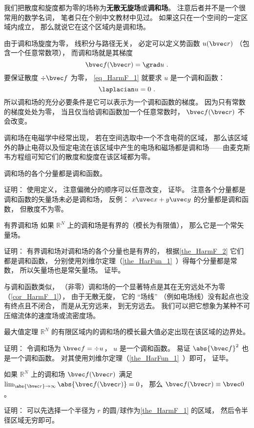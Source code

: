 


我们把散度和旋度都为零的场称为\textbf{无散无旋场}或\textbf{调和场}。 注意后者并不是一个很常用的数学名词， 笔者只在个别中文教材中见过。 如果这只在一个空间的一定区域内成立， 那么就说它在这个区域内是调和场。

由于调和场旋度为零， 线积分与路径无关， 必定可以定义势函数 $u(\bvec r)$ （包含一个任意常数项）， 而调和场就是其梯度
\begin{equation}\label{eq_HarmF_1}
\bvec f(\bvec r) = \grad u~.
\end{equation}
要保证散度 $\div \bvec f$ 为零， \autoref{eq_HarmF_1} 就要求 $u$ 是一个调和函数：
\begin{equation}
\laplacian u = 0~.
\end{equation}
所以调和场的充分必要条件是它可以表示为一个调和函数的梯度。 因为只有常数的梯度处处为零， 当且仅当给调和函数加一个任意常数时， $\bvec f(\bvec r)$ 不会改变。

调和场在电磁学中经常出现， 若在空间选取中一个不含电荷的区域， 那么该区域外的静止电荷以及恒定电流在该区域中产生的电场和磁场都是调和场——由麦克斯韦方程组可知它们的散度和旋度在该区域都为零。

\begin{theorem}{}\label{the_HarmF_2}
调和场的各个分量都是调和函数。
\end{theorem}
证明： 使用定义， 注意偏微分的顺序可以任意改变， 证毕。 注意各个分量都是调和函数的矢量场未必是调和场， 反例： $x\uvec x + y \uvec y$ 的分量都是调和函数， 但散度不为零。

\begin{corollary}{有界调和场}
如果 $\mathbb R^N$ 上的调和场是有界的（模长为有限值）， 那么它是一个常矢量场。
\end{corollary}
证明： 有界调和场对调和场的各个分量也是有界的， 根据\autoref{the_HarmF_2} 它们都是调和函数， 分别使用刘维尔定理（\autoref{the_HarFun_1}~）得每个分量都是常数， 所以矢量场也是常矢量场。 证毕。

与调和函数类似， （非零）调和场的一个显著特点是其在无穷远处不为零（\autoref{cor_HarmF_1}）， 由于无散无旋， 它的 “场线” （例如电场线）没有起点也没有终点且不闭合， 而是从无穷远来， 到无穷远去。 我们可以把它想象为某种不可压缩流体的速度场或流密度场。

\begin{theorem}{最大值定理}\label{the_HarmF_1}
$\mathbb R^N$ 的有限区域内的调和场的模长最大值必定出现在该区域的边界处。
\end{theorem}
证明： 令调和场为 $\bvec f = \div u$， $u$ 是一个调和函数。 易证 $\abs{\bvec f}^2$ 也是一个调和函数。 对其使用刘维尔定理（\autoref{the_HarFun_1}~）即可， 证毕。

\begin{corollary}{}\label{cor_HarmF_1}
如果 $\mathbb R^N$ 上的调和场 $\bvec f(\bvec r)$ 满足 $\lim_{\abs{\bvec r}\to \infty} \abs{\bvec f(\bvec r)}  = 0$， 那么 $\bvec f(\bvec r) \equiv \bvec 0$。
\end{corollary}
证明： 可以先选择一个半径为 $r$ 的圆/球作为\autoref{the_HarmF_1} 的区域， 然后令半径区域无穷即可。
